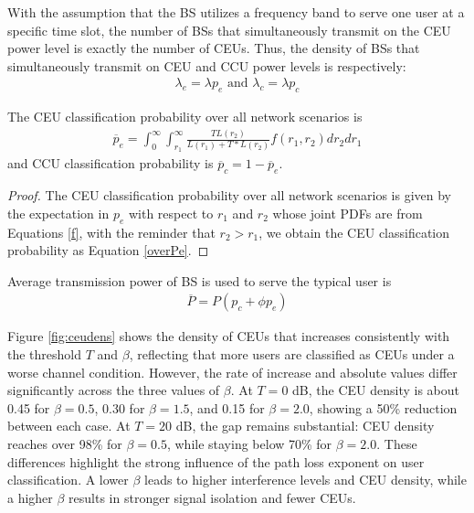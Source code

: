 \documentclass{svproc}
\begin{document}
With the assumption that the BS utilizes a frequency band to serve one user at a specific time slot, the number of BSs that simultaneously transmit on the CEU power level is exactly the number of CEUs. Thus, the density of BSs that simultaneously transmit on CEU and CCU power levels is respectively:
\begin{align}
	\lambda_e = \lambda p_e \text{ and } \lambda_c = \lambda p_c
	\label{BSdens}
\end{align}

\begin{proposition}
	The CEU classification probability over all network scenarios is
	\begin{align}
		\overline{p}_e = \int_{0}^{\infty}\int_{r_1}^{\infty}\frac{TL(r_2)}{L(r_1)+T*L(r_2)}f(r_1,r_2)dr_2dr_1
		\label{overPe}
	\end{align}
	and CCU classification probability is $\overline{p}_c = 1-\overline{p}_e$.
\end{proposition}
\begin{proof}
	The CEU classification probability over all network scenarios is given by the expectation in $p_e$ with respect to $r_1$ and $r_2$ whose joint PDFs are from Equations \ref{f}, with the reminder that $r_2>r_1$, we obtain the CEU classification probability as Equation \ref{overPe}.
\end{proof}

\begin{proposition}
	Average transmission power of BS is used to serve the typical user is
	\begin{align}
		\overline{P} = P(p_c+\phi p_e)
	\end{align}	
\end{proposition}	

Figure \ref{fig:ceudens} shows the density of CEUs that increases consistently with the threshold $T$ and $\beta$, reflecting that more users are classified as CEUs under a worse channel condition. However, the rate of increase and absolute values differ significantly across the three values of $\beta$. At $T = 0$ dB, the CEU density is about 0.45 for $\beta = 0.5$, 0.30 for $\beta = 1.5$, and 0.15 for $\beta = 2.0$, showing a 50\% reduction between each case. At $T = 20$ dB, the gap remains substantial: CEU density reaches over 98\% for $\beta = 0.5$, while staying below 70\% for $\beta = 2.0$. These differences highlight the strong influence of the path loss exponent on user classification. A lower $\beta$ leads to higher interference levels and CEU density, while a higher $\beta$ results in stronger signal isolation and fewer CEUs.
\end{document}
